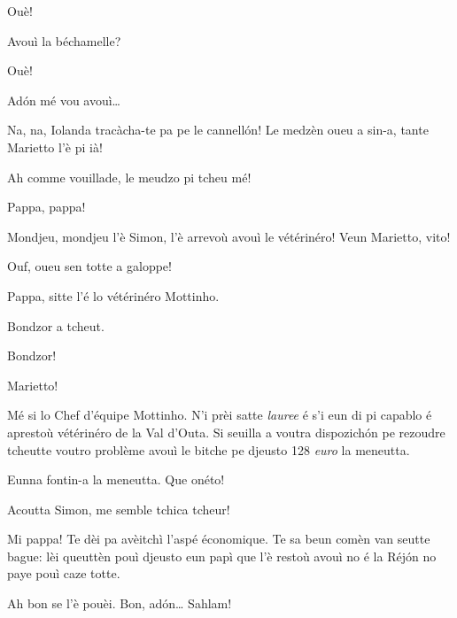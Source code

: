 \begin{drama}
\Iolandaspeaks Ouè!

\Mariettospeaks Avouì la béchamelle?

\Iolandaspeaks Ouè!

\Mariettospeaks {} Ad\'on mé vou avouì\ldots

\Cienspeaks {} Na, na, Iolanda tracàcha-te pa pe le cannell\'on! Le medzèn oueu a sin-a, tante Marietto l'è pi ià!

\Iolandaspeaks Ah comme vouillade, le meudzo pi tcheu mé!


\Simonspeaks {} Pappa, pappa!

\Cienspeaks Mondjeu, mondjeu l'è Simon, l'è arrevoù avouì le vétérinéro! Veun Marietto, vito!

\Mariettospeaks Ouf, oueu sen totte a galoppe!


\Simonspeaks {} Pappa, sitte l’é lo vétérinéro Mottinho.

\Chefspeaks {} Bondzor a tcheut. 

\Simonspeaks {} Bondzor!

\Mariettospeaks Marietto!

\Chefspeaks Mé si lo Chef d’équipe Mottinho. N'i prèi satte \textit{lauree} é s’i eun di pi capablo é aprestoù vétérinéro de la Val d'Outa. Si seuilla a voutra dispozich\'on pe rezoudre tcheutte voutro problème avouì le bitche pe djeusto 128 \textit{euro} la meneutta.

\Mariettospeaks {} Eunna fontin-a la meneutta. Que onéto!


\Cienspeaks {} Acoutta Simon,  me semble tchica tcheur!

\Simonspeaks Mi pappa! Te dèi pa avèitchì l'aspé économique. Te sa beun comèn van seutte bague: lèi queuttèn pouì djeusto eun papì que l’è restoù avouì no é la Réj\'on no paye pouì caze totte.

\Cienspeaks Ah bon se l’è pouèi. Bon, ad\'on\ldots {} Sahlam!


\end{drama}
